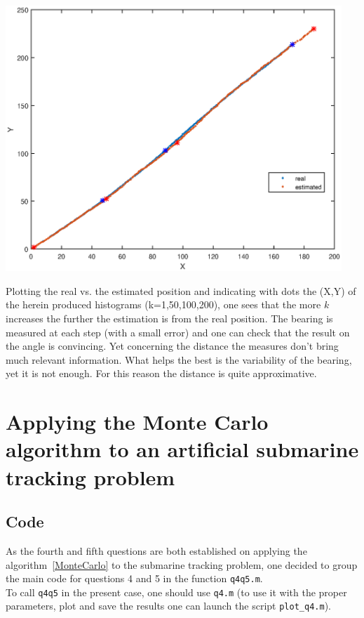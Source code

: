 \documentclass[english,DIV=13]{scrreprt}
\begin{document}
\begin{center}
	\begin{minipage}{.6\textwidth}
		\includegraphics[width=0.95\textwidth]{img/q3_path.eps}
	\end{minipage}%
	\begin{minipage}{.4\textwidth}
		Plotting the real vs. the estimated position and indicating with dots the (X,Y) of the 
		herein produced histograms (k=1,50,100,200), one sees that the more $k$ increases
		the further the estimation is from the real position. The bearing is measured at each step (with a small error) and
		one can check that the result on the angle is convincing. Yet concerning the distance the measures don't bring
		much relevant information. What helps the best is the variability of the bearing, yet it is not enough. For this
		reason the distance is quite approximative.
	\end{minipage}
\end{center}

\chapter{Applying the Monte Carlo algorithm to an artificial submarine 
tracking problem}
\section*{Code}

As the fourth and fifth questions are both established on applying the algorithm~\ref{MonteCarlo}
to the submarine tracking problem, one decided to group the main code for questions 4 and 5
in the function \texttt{q4q5.m}.\\

To call \texttt{q4q5} in the present case, one should use \texttt{q4.m} (to use it with the proper parameters,
plot and save the results one can launch the script \texttt{plot\_q4.m}).\\

\end{document}
